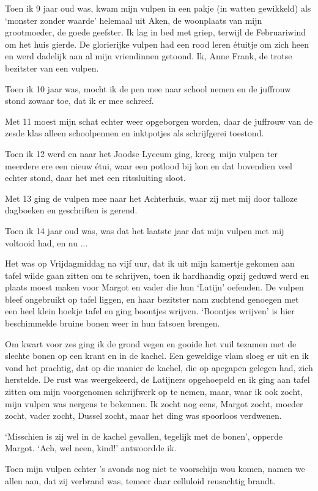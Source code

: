 \documentclass{book}
\begin{document}
Toen ik 9 jaar oud was, kwam mijn vulpen in een pakje (in watten
gewikkeld) als `monster zonder waarde' helemaal uit Aken, de woonplaats
van mijn grootmoeder, de goede geefster. Ik lag in bed met griep,
terwijl de Februariwind om het huis gierde. De glorierijke vulpen had
een rood leren étuitje om zich heen en werd dadelijk aan al mijn
vriendinnen getoond. Ik, Anne Frank, de trotse bezitster van een vulpen.

Toen ik 10 jaar was, mocht ik de pen mee naar school nemen en de
juffrouw stond zowaar toe, dat ik er mee schreef.

Met 11 moest mijn schat echter weer opgeborgen worden, daar de juffrouw
van de zesde klas alleen schoolpennen en inktpotjes als schrijfgerei
toestond.

Toen ik 12 werd en naar het Joodse Lyceum ging, kreeg~mijn vulpen ter
meerdere ere een nieuw étui, waar een potlood bij kon en dat bovendien
veel echter stond, daar het met een ritssluiting sloot.

Met 13 ging de vulpen mee naar het Achterhuis, waar zij met mij door
talloze dagboeken en geschriften is gerend.

Toen ik 14 jaar oud was, was dat het laatste jaar dat mijn vulpen met
mij voltooid had, en nu ...

Het was op Vrijdagmiddag na vijf uur, dat ik uit mijn kamertje gekomen
aan tafel wilde gaan zitten om te schrijven, toen ik hardhandig opzij
geduwd werd en plaats moest maken voor Margot en vader die hun `Latijn'
oefenden. De vulpen bleef ongebruikt op tafel liggen, en haar bezitster
nam zuchtend genoegen met een heel klein hoekje tafel en ging boontjes
wrijven. `Boontjes wrijven' is hier beschimmelde bruine bonen weer in
hun fatsoen brengen.

Om kwart voor zes ging ik de grond vegen en gooide het vuil tezamen met
de slechte bonen op een krant en in de kachel. Een geweldige vlam sloeg
er uit en ik vond het prachtig, dat op die manier de kachel, die op
apegapen gelegen had, zich herstelde. De rust was weergekeerd, de
Latijners opgehoepeld en ik ging aan tafel zitten om mijn voorgenomen
schrijfwerk op te nemen, maar, waar ik ook zocht, mijn vulpen was
nergens te bekennen. Ik zocht nog eens, Margot zocht, moeder zocht,
vader zocht, Dussel zocht, maar het ding was spoorloos verdwenen.

`Misschien is zij wel in de kachel gevallen, tegelijk met de bonen',
opperde Margot. `Ach, wel neen, kind!' antwoordde ik.

Toen mijn vulpen echter 's avonds nog niet te voorschijn wou komen,
namen we allen aan, dat zij verbrand was, temeer daar celluloid
reusachtig brandt.
\end{document}
